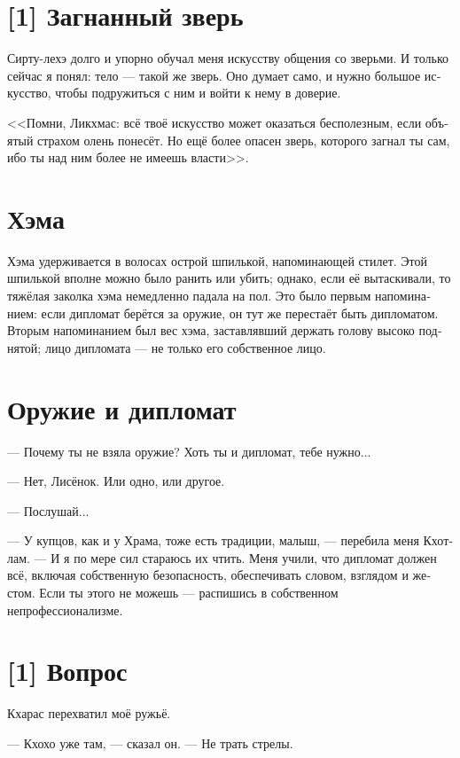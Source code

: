 \documentclass[a4paper,12pt,fleqn]{book}\usepackage{polyglossia}\setdefaultlanguage[babelshorthands=true]{russian}\setotherlanguage{english}\defaultfontfeatures{Ligatures=TeX,Mapping=tex-text}\usepackage{xcolor}\newcommand{\ml}[3]{#2}
\begin{document}
{\section{[1] Загнанный зверь}

Сирту-лехэ долго и упорно обучал меня искусству общения со зверьми.
И только сейчас я понял: тело --- такой же зверь.
Оно думает само, и нужно большое искусство, чтобы подружиться с ним и войти к нему в доверие.

<<Помни, Ликхмас: всё твоё искусство может оказаться бесполезным, если объятый страхом олень понесёт.
Но ещё более опасен зверь, которого загнал ты сам, ибо ты над ним более не имеешь власти>>.

\section{Хэма}

Хэма удерживается в волосах острой шпилькой, напоминающей стилет.
Этой шпилькой вполне можно было ранить или убить;
однако, если её вытаскивали, то тяжёлая заколка хэма немедленно падала на пол.
Это было первым напоминанием: если дипломат берётся за оружие, он тут же перестаёт быть дипломатом.
Вторым напоминанием был вес хэма, заставлявший держать голову высоко поднятой;
лицо дипломата --- не только его собственное лицо.

\section{Оружие и дипломат}

--- Почему ты не взяла оружие?
Хоть ты и дипломат, тебе нужно...

--- Нет, Лисёнок.
Или одно, или другое.

--- Послушай...

--- У купцов, как и у Храма, тоже есть традиции, малыш, --- перебила меня Кхотлам.
--- И я по мере сил стараюсь их чтить.
Меня учили, что дипломат должен всё, включая собственную безопасность, обеспечивать словом, взглядом и жестом.
Если ты этого не можешь --- распишись в собственном непрофессионализме.

\section{[1] Вопрос}

Кхарас перехватил моё ружьё.

--- Кхохо уже там, --- сказал он.
--- Не трать стрелы.

}
\end{document}
